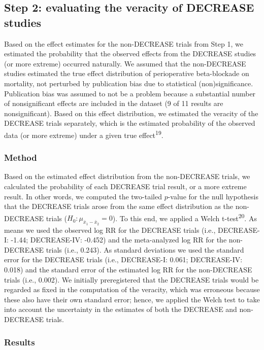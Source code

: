 \documentclass[]{article}
\begin{document}
\subsection{Step 2: evaluating the veracity of DECREASE
studies}\label{step-2-evaluating-the-veracity-of-decrease-studies}

Based on the effect estimates for the non-DECREASE trials from Step 1,
we estimated the probability that the observed effects from the DECREASE
studies (or more extreme) occurred naturally. We assumed that the
non-DECREASE studies estimated the true effect distribution of
perioperative beta-blockade on mortality, not perturbed by publication
bias due to statistical (non)significance. Publication bias was assumed
to not be a problem because a substantial number of nonsignificant
effects are included in the dataset (9 of 11 results are
nonsignificant). Based on this effect distribution, we estimated the
veracity of the DECREASE trials separately, which is the estimated
probability of the observed data (or more extreme) under a given true
effect\textsuperscript{19}.

\subsubsection{Method}\label{method}

Based on the estimated effect distribution from the non-DECREASE trials,
we calculated the probability of each DECREASE trial result, or a more
extreme result. In other words, we computed the two-tailed \(p\)-value
for the null hypothesis that the DECREASE trials arose from the same
effect distribution as the non-DECREASE trials
(\(H_0:\mu_{\bar{x}_1-\bar{x}_2}=0\)). To this end, we applied a Welch
t-test\textsuperscript{20}. As means we used the observed log RR for the
DECREASE trials (i.e., DECREASE-I: -1.44; DECREASE-IV: -0.452) and the
meta-analyzed log RR for the non-DECREASE trials (i.e., 0.243). As
standard deviations we used the standard error for the DECREASE trials
(i.e., DECREASE-I: 0.061; DECREASE-IV: 0.018) and the standard error of
the estimated log RR for the non-DECREASE trials (i.e., 0.002). We
initially preregistered that the DECREASE trials would be regarded as
fixed in the computation of the veracity, which was erroneous because
these also have their own standard error; hence, we applied the Welch
test to take into account the uncertainty in the estimates of both the
DECREASE and non-DECREASE trials.

\subsubsection{Results}\label{results-1}
\end{document}
